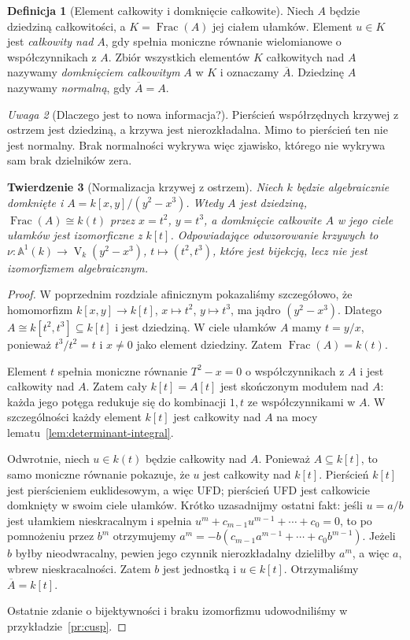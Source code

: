 \documentclass[11pt,a4paper,openany]{report}
\numberwithin{equation}{section}
\theoremstyle{plain}
\newtheorem{twierdzenie}{Twierdzenie}[section]
\theoremstyle{definition}
\newtheorem{definicja}[twierdzenie]{Definicja}
\theoremstyle{remark}
\newtheorem{uwaga}[twierdzenie]{Uwaga}
\newcommand{\A}{\mathbb A}
\newcommand{\V}{\operatorname V}
\newcommand{\Frac}{\operatorname{Frac}}
\begin{document}
\begin{definicja}[Element całkowity i domknięcie całkowite]
Niech $A$ będzie dziedziną całkowitości, a
$K=\Frac(A)$ jej ciałem ułamków. Element $u\in K$
jest \emph{całkowity nad $A$}, gdy spełnia moniczne
równanie wielomianowe o współczynnikach z $A$.
Zbiór wszystkich elementów $K$ całkowitych nad $A$
nazywamy \emph{domknięciem całkowitym} $A$ w $K$
i oznaczamy $\overline A$. Dziedzinę $A$ nazywamy
\emph{normalną}, gdy $\overline A=A$.
\end{definicja}

\begin{uwaga}[Dlaczego jest to nowa informacja?]
Pierścień współrzędnych krzywej z ostrzem jest dziedziną,
a krzywa jest nierozkładalna. Mimo to pierścień ten
nie jest normalny. Brak normalności wykrywa więc
zjawisko, którego nie wykrywa sam brak dzielników zera.
\end{uwaga}

\begin{twierdzenie}[Normalizacja krzywej z ostrzem]
\label{tw:normalize-cusp}
Niech $k$ będzie algebraicznie domknięte i
$A=k[x,y]/(y^2-x^3)$. Wtedy $A$ jest dziedziną,
$\Frac(A)\cong k(t)$ przez $x=t^2$, $y=t^3$,
a domknięcie całkowite $A$ w jego ciele ułamków jest
izomorficzne z $k[t]$. Odpowiadające odwzorowanie
krzywych to $\nu:\A^1(k)\to\V_k(y^2-x^3)$,
$t\mapsto(t^2,t^3)$, które jest bijekcją, lecz nie jest
izomorfizmem algebraicznym.
\end{twierdzenie}
\begin{proof}
W poprzednim rozdziale afinicznym pokazaliśmy szczegółowo,
że homomorfizm $k[x,y]\to k[t]$,
$x\mapsto t^2$, $y\mapsto t^3$, ma jądro $(y^2-x^3)$.
Dlatego $A\cong k[t^2,t^3]\subseteq k[t]$ i jest dziedziną.
W ciele ułamków $A$ mamy $t=y/x$, ponieważ
$t^3/t^2=t$ i $x\ne0$ jako element dziedziny.
Zatem $\Frac(A)=k(t)$.

Element $t$ spełnia moniczne równanie $T^2-x=0$
o współczynnikach z $A$ i jest całkowity nad $A$.
Zatem cały $k[t]=A[t]$ jest skończonym modułem nad $A$:
każda jego potęga redukuje się do kombinacji
$1,t$ ze współczynnikami w $A$.
W szczególności każdy element $k[t]$ jest całkowity nad $A$
na mocy lematu~\ref{lem:determinant-integral}.

Odwrotnie, niech $u\in k(t)$ będzie całkowity nad $A$.
Ponieważ $A\subseteq k[t]$, to samo moniczne równanie
pokazuje, że $u$ jest całkowity nad $k[t]$.
Pierścień $k[t]$ jest pierścieniem euklidesowym, a więc
UFD; pierścień UFD jest całkowicie domknięty w swoim
ciele ułamków. Krótko uzasadnijmy ostatni fakt:
jeśli $u=a/b$ jest ułamkiem nieskracalnym i spełnia
$u^m+c_{m-1}u^{m-1}+\cdots+c_0=0$, to po pomnożeniu
przez $b^m$ otrzymujemy
$a^m=-b(c_{m-1}a^{m-1}+\cdots+c_0b^{m-1})$.
Jeżeli $b$ byłby nieodwracalny, pewien jego czynnik
nierozkładalny dzieliłby $a^m$, a więc $a$, wbrew
nieskracalności. Zatem $b$ jest jednostką i $u\in k[t]$.
Otrzymaliśmy $\overline A=k[t]$.

Ostatnie zdanie o bijektywności i braku izomorfizmu
udowodniliśmy w przykładzie~\ref{pr:cusp}.
\end{proof}
\end{document}
